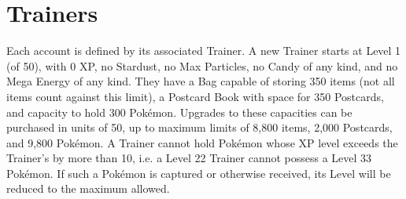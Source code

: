 \chapter{Trainers}
Each account is defined by its associated Trainer.
A new Trainer starts at Level 1 (of 50), with 0 XP, no Stardust, no Max Particles,
 no Candy of any kind, and no Mega Energy of any kind.
They have a Bag capable of storing 350 items (not all items count against this limit),
 a Postcard Book with space for 350 Postcards,
 and capacity to hold 300 Pokémon.
Upgrades to these capacities can be purchased in units of 50, up to maximum limits
 of 8,800 items, 2,000 Postcards, and 9,800 Pokémon.
A Trainer cannot hold Pokémon whose XP level exceeds the Trainer's
 by more than 10, i.e. a Level 22 Trainer cannot possess a Level 33
 Pokémon. If such a Pokémon is captured or otherwise received, its
 Level will be reduced to the maximum allowed.

